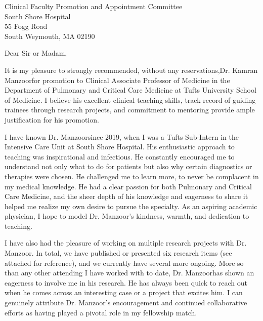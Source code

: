 \documentclass[10pt, a4paper]{letter} %
\newcommand{\position}{Clinical Associate Professor of Medicine in the Department of Pulmonary and Critical Care Medicine at Tufts University School of Medicine}
\newcommand{\candidate}{Dr. Kamran Manzoor}
\newcommand{\candidateShort}{Dr. Manzoor}
\newcommand{\recStrength}{strongly recommended, without any reservations,}
\newcommand{\pccm}{Pulmonary and Critical Care Medicine}
\begin{document}

\begin{letter}{
  Clinical Faculty Promotion and Appointment Committee\\
  South Shore Hospital\\
  55 Fogg Road\\
  South Weymouth, MA 02190
}



\opening{Dear Sir or Madam,}

It is my pleasure to \recStrength \space \candidate \space for promotion to \position.
I believe his excellent clinical teaching skills, track record of guiding trainees through research projects, and commitment to mentoring provide ample justification for his promotion. 

I have known \candidateShort \space since 2019, when I was a Tufts Sub-Intern in the Intensive Care Unit at South Shore Hospital. His enthusiastic approach to teaching was inspirational and infectious.
He constantly encouraged me to understand not only what to do for patients but also why certain diagnostics or therapies were chosen.
He challenged me to learn more, to never be complacent in my medical knowledge.
He had a clear passion for both \pccm, and the sheer depth of his knowledge and eagerness to share it helped me realize my own desire to pursue the specialty.
As an aspiring academic physician, I hope to model \candidateShort's kindness, warmth, and dedication to teaching. 

I have also had the pleasure of working on multiple research projects with \candidateShort.  
In total, we have published or presented six research items (see attached for reference), and we currently have several more ongoing.
More so than any other attending I have worked with to date, \candidateShort \space has shown an eagerness to involve me in his research.
He has always been quick to reach out when he comes across an interesting case or a project that excites him.
I can genuinely attribute \candidateShort’s encouragement and continued collaborative efforts as having played a pivotal role in my fellowship match.  


\end{letter}
\end{document}
